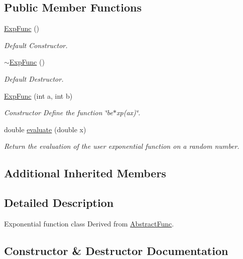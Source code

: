 \subsection*{Public Member Functions}
\begin{DoxyCompactItemize}
\item 
\mbox{\label{classExpFunc_a92994226f51d2c3d360df145e3720721}} 
\hyperlink{classExpFunc_a92994226f51d2c3d360df145e3720721}{Exp\+Func} ()
\begin{DoxyCompactList}\small\item\em Default Constructor. \end{DoxyCompactList}\item 
\mbox{\label{classExpFunc_acfad0935316f9182e83f39949fc63c2c}} 
\hyperlink{classExpFunc_acfad0935316f9182e83f39949fc63c2c}{$\sim$\+Exp\+Func} ()
\begin{DoxyCompactList}\small\item\em Default Destructor. \end{DoxyCompactList}\item 
\hyperlink{classExpFunc_a3dde289a9b9da2d3d830f71f15b4a762}{Exp\+Func} (int a, int b)
\begin{DoxyCompactList}\small\item\em Constructor Define the function \char`\"{}be$\ast$xp(ax)\char`\"{}. \end{DoxyCompactList}\item 
double \hyperlink{classExpFunc_a338e91308f12a66e3d1989ed5f589626}{evaluate} (double x)
\begin{DoxyCompactList}\small\item\em Return the evaluation of the user exponential function on a random number. \end{DoxyCompactList}\end{DoxyCompactItemize}
\subsection*{Additional Inherited Members}


\subsection{Detailed Description}
Exponential function class Derived from \hyperlink{classAbstractFunc}{Abstract\+Func}. 

\subsection{Constructor \& Destructor Documentation}
\mbox{\label{classExpFunc_a3dde289a9b9da2d3d830f71f15b4a762}} 
